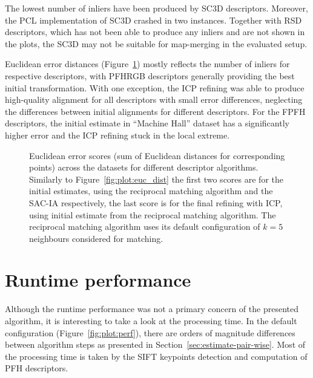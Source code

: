 The lowest number of inliers have been produced by \gls{SC3D} descriptors. Moreover, the \gls{PCL} implementation of \gls{SC3D} crashed in two instances. Together with \gls{RSD} descriptors, which has not been able to produce any inliers and are not shown in the plots, the \gls{SC3D} may not be suitable for map-merging in the evaluated setup.

Euclidean error distances (Figure~\ref{fig:plot:desc_dist}) mostly reflects the number of inliers for respective descriptors, with \gls{PFHRGB} descriptors generally providing the best initial transformation. With one exception, the \gls{ICP} refining was able to produce high-quality alignment for all descriptors with small error differences, neglecting the differences between initial alignments for different descriptors. For the \gls{FPFH} descriptors, the initial estimate in ``Machine Hall'' dataset has a significantly higher error and the \gls{ICP} refining stuck in the local extreme.

\begin{figure}
  \centering
  
  \caption[Euclidean error scores per descriptors]{Euclidean error scores (sum of Euclidean distances for corresponding points) across the datasets for different descriptor algorithms. Similarly to Figure~\ref{fig:plot:euc_dist} the first two scores are for the initial estimates, using the reciprocal matching algorithm and the \gls{SAC-IA} respectively, the last score is for the final refining with \gls{ICP}, using initial estimate from the reciprocal matching algorithm. The reciprocal matching algorithm uses its default configuration of $k=5$ neighbours considered for matching.}
  \label{fig:plot:desc_dist}
\end{figure}

\section{Runtime performance}
\label{sec:runtime-perf}

Although the runtime performance was not a primary concern of the presented algorithm, it is interesting to take a look at the processing time. In the default configuration (Figure~\ref{fig:plot:perf}), there are orders of magnitude differences between algorithm steps as presented in Section~\ref{sec:estimate-pair-wise}. Most of the processing time is taken by the \gls{SIFT} keypoints detection and computation of \gls{PFH} descriptors.

